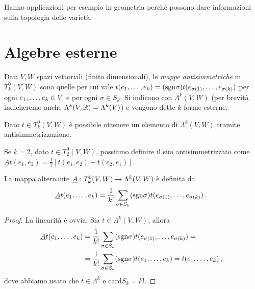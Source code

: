 Hanno applicazioni per esempio in geometria perché possono dare informazioni sulla topologia delle varietà.

\section{Algebre esterne}

Dati $V,W$ spazi vettoriali (finito dimensionali), le \emph{mappe antisimmetriche} in $T^0_k(V,W)$ sono quelle per cui vale $t(\seqb{e}{k}{,}) = (\sgn \sigma) t(e_{\sigma(1)},\ldots, e_{\sigma(k)})$ per ogni $\seqb{e}{k}{,} \in V$ e per ogni $\sigma\in S_k$.
Si indicano con $\Lambda^k(V,W)$ (per brevità indicheremo anche $\Lambda^k(V,\R) = \Lambda^k(V)$) e vengono dette $k$-forme esterne.

Dato $t\in T^0_k(V,W)$ è possibile ottenere un elemento di $\Lambda^k(V,W)$ tramite antisimmetrizzazione. 
\begin{example}
	Se $k=2$, dato $t\in T^0_2(V,W)$, possiamo definire il suo antisimmetrizzato come $\underline{A}t(e_1,e_2) = \frac 12 [t(e_1,e_2) - t(e_2,e_1)]$.
\end{example}

\begin{definition}
	La mappa alternante $\antisimm:T^0_k(V,W) \to \Lambda^k(V,W)$ è definita da
	\begin{equation*}
		\antisimm t(\seqb{e}{k}{,}) = \frac 1 {k!} \sum_{\sigma \in S_k} (\sgn \sigma) t(e_{\sigma(1)},\ldots, e_{\sigma(k)}) \punto
	\end{equation*}
\end{definition}

\begin{proposition}
\end{proposition}
\begin{proof}
	La linearità è ovvia. Sia $t\in\Lambda^k(V,W)$, allora
	\begin{align*}
		\antisimm t(\seqb{e}{k}{,}) &= \frac 1 {k!} \sum_{\sigma \in S_k} (\sgn \sigma) t(e_{\sigma(1)},\ldots, e_{\sigma(k)}) =\\
		& = \frac 1 {k!} \sum_{\sigma \in S_k} (\sgn \sigma) t(\seqb{e}{k}{,}) = t (\seqb{e}{k}{,}) \virgola
	\end{align*}
	dove abbiamo usato che $t\in\Lambda^k$ e $\mathrm{card} S_k = k!$.
\end{proof}

